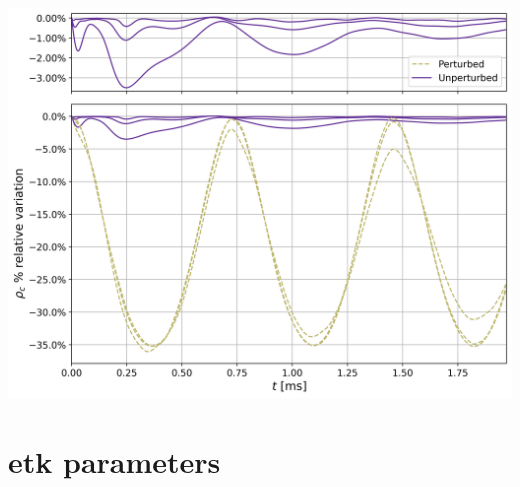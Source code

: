 \documentclass[11pt, a4paper]{article}
\begin{document}
\begin{center}
    \centering
    \includegraphics[width=1\linewidth]{images/rhoc_all_typecompare.png}
    \label{fig:ns_rhoc_all_compare}
\end{center}

\newpage

\section{\acrlong{etk} parameters}
\end{document}
